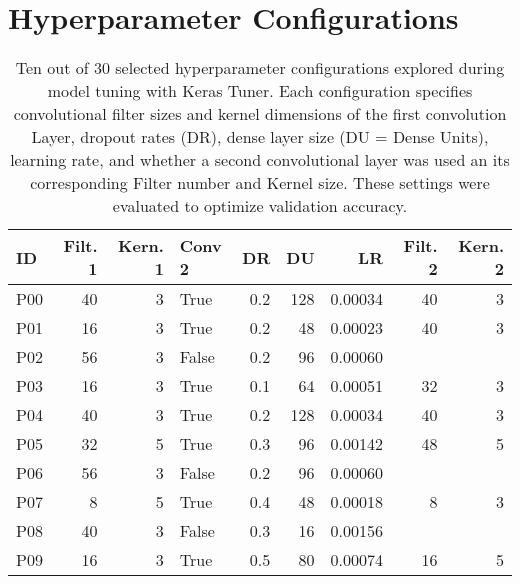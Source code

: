 \section{Hyperparameter Configurations}
\label{sec:Hyperparameter Configurations}

\begin{table}[H]
    \centering
    \caption{Ten out of 30 selected hyperparameter configurations explored during model tuning with Keras Tuner. Each configuration specifies 
    convolutional filter sizes and kernel dimensions of the first convolution Layer, dropout rates (DR), dense layer size (DU = Dense Units), 
    learning rate, and whether a second convolutional layer was used an its corresponding Filter number and Kernel size. 
    These settings were evaluated to optimize validation accuracy.}
    \label{tab:Hyperparameter_Config_tab}
    \begin{tabular}{lrrlrrrrr}
        \hline
        \textbf{ID} & \textbf{Filt. 1} & \textbf{Kern. 1} & \textbf{Conv 2} & \textbf{DR} & \textbf{DU} & \textbf{LR} & 
        \textbf{Filt. 2} & \textbf{Kern. 2} \\
        \hline
        P00 & 40 & 3 & True  & 0.2 & 128 & 0.00034 & 40 & 3 \\
        P01 & 16 & 3 & True  & 0.2 & 48  & 0.00023 & 40 & 3 \\
        P02 & 56 & 3 & False & 0.2 & 96  & 0.00060 &    &   \\
        P03 & 16 & 3 & True  & 0.1 & 64  & 0.00051 & 32 & 3 \\
        P04 & 40 & 3 & True  & 0.2 & 128 & 0.00034 & 40 & 3 \\
        P05 & 32 & 5 & True  & 0.3 & 96  & 0.00142 & 48 & 5 \\
        P06 & 56 & 3 & False & 0.2 & 96  & 0.00060 &    &   \\
        P07 & 8  & 5 & True  & 0.4 & 48  & 0.00018 & 8  & 3 \\
        P08 & 40 & 3 & False & 0.3 & 16  & 0.00156 &    &   \\
        P09 & 16 & 3 & True  & 0.5 & 80  & 0.00074 & 16 & 5 \\
        \hline
    \end{tabular}
\end{table}
